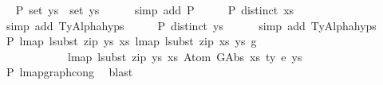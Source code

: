 \begin{isabellebody}
\ \isamarkupfalse%
\ P{}{\isacharcolon}{\kern0pt}\ {\isachardoublequoteopen}set\ ys{\isacharprime}{\kern0pt}\ {\isacharequal}{\kern0pt}\ set\ ys{\isachardoublequoteclose}\isanewline
\ \ \ \ \isamarkupfalse%
\ {\isacharparenleft}{\kern0pt}simp\ add{\isacharcolon}{\kern0pt}\ P{}{\isacharparenright}{\kern0pt}\isanewline
\isanewline
\ \ \isamarkupfalse%
\ \isamarkupfalse%
\ P{}{\isacharcolon}{\kern0pt}\ {\isachardoublequoteopen}distinct\ xs{\isacharprime}{\kern0pt}{\isachardoublequoteclose}\isanewline
\ \ \ \ \isamarkupfalse%
\ {\isacharparenleft}{\kern0pt}simp\ add{\isacharcolon}{\kern0pt}\ TyAlpha{\isachardot}{\kern0pt}hyps{\isacharparenleft}{\kern0pt}{}{\isacharparenright}{\kern0pt}{\isacharparenright}{\kern0pt}\isanewline
\ \ \isamarkupfalse%
\ \isamarkupfalse%
\ P{}{\isacharcolon}{\kern0pt}\ {\isachardoublequoteopen}distinct\ ys{\isacharprime}{\kern0pt}{\isachardoublequoteclose}\isanewline
\ \ \ \ \isamarkupfalse%
\ {\isacharparenleft}{\kern0pt}simp\ add{\isacharcolon}{\kern0pt}\ TyAlpha{\isachardot}{\kern0pt}hyps{\isacharparenleft}{\kern0pt}{}{\isacharparenright}{\kern0pt}{\isacharparenright}{\kern0pt}\isanewline
\isanewline
\ \ \isamarkupfalse%
\ P{}{\isacharcolon}{\kern0pt}\ {\isachardoublequoteopen}lmap\ {\isacharparenleft}{\kern0pt}lsubst\ {\isacharparenleft}{\kern0pt}zip\ ys{\isacharprime}{\kern0pt}\ xs{\isacharprime}{\kern0pt}{\isacharparenright}{\kern0pt}{\isacharparenright}{\kern0pt}\ {\isacharparenleft}{\kern0pt}lmap\ {\isacharparenleft}{\kern0pt}lsubst\ {\isacharparenleft}{\kern0pt}zip\ xs{\isacharprime}{\kern0pt}\ ys{\isacharprime}{\kern0pt}{\isacharparenright}{\kern0pt}{\isacharparenright}{\kern0pt}\ g{\isacharparenright}{\kern0pt}\ {\isasymsimeq}\isanewline
\ \ \ \ \ \ \ \ \ \ \ \ lmap\ {\isacharparenleft}{\kern0pt}lsubst\ {\isacharparenleft}{\kern0pt}zip\ ys{\isacharprime}{\kern0pt}\ xs{\isacharprime}{\kern0pt}{\isacharparenright}{\kern0pt}{\isacharparenright}{\kern0pt}\ {\isacharparenleft}{\kern0pt}Atom\ {\isacharparenleft}{\kern0pt}GAbs\ xs\ ty{}\ e{\isacharparenright}{\kern0pt}\ ys{\isacharparenright}{\kern0pt}{\isachardoublequoteclose}\isanewline
\ \ \ \ \ \ \isamarkupfalse%
\ P{}\ lmap{\isacharunderscore}{\kern0pt}graph{\isacharunderscore}{\kern0pt}cong\ \isamarkupfalse%
\ blast\isanewline
\ \ \isamarkupfalse%

\end{isabellebody}
